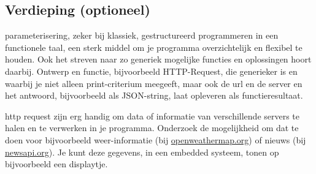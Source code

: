 \subsection{Verdieping (optioneel)}
\vspace{5mm} 

\begin{exercise}
parameterisering, zeker bij klassiek, gestructureerd programmeren in een functionele taal, een sterk middel om je programma overzichtelijk en flexibel te houden. Ook het streven naar zo generiek mogelijke functies en oplossingen hoort daarbij. Ontwerp en functie, bijvoorbeeld HTTP-Request, die generieker is en waarbij je niet alleen print-criterium meegeeft, maar ook de url en de server en het antwoord, bijvoorbeeld als JSON-string, laat opleveren als functieresultaat.
\end{exercise}

\begin{exercise}
  http request zijn erg handig om data of informatie van verschillende servers te halen en te verwerken in je programma. Onderzoek de mogelijkheid om dat te doen voor bijvoorbeeld weer-informatie (bij \url{openweathermap.org}) of nieuws (bij \url{newsapi.org}). Je kunt deze gegevens, in een embedded systeem, tonen op bijvoorbeeld een displaytje.
\end{exercise}

